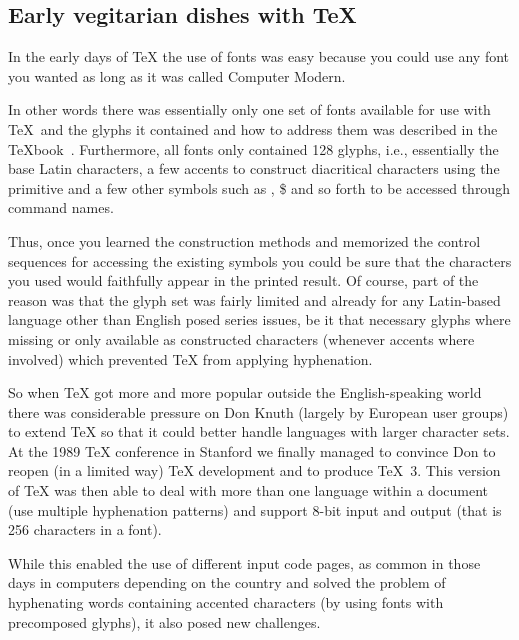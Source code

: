\documentclass{ltugboat}
\begin{document}
\subsection{Early  vegitarian dishes with \TeX{}}

In the early days of \TeX{} the use of fonts was easy because you
could use any font you wanted as long as it was called Computer
Modern.

In other words there was essentially only one set of fonts available
for use with \TeX\ and the glyphs it contained and how to address them
was described in the \TeX{}book~\cite{}. Furthermore, all fonts only
contained 128 glyphs, i.e., essentially the base Latin characters, a
few accents to construct diacritical characters using the 
primitive and a few other symbols such as \textdagger, \$ and so forth
to be accessed through command names.

Thus, once you learned the construction methods and memorized the
control sequences for accessing the existing symbols you could be sure
that the characters you used would faithfully appear in the printed
result. Of course, part of the reason was that the glyph set was
fairly limited and already for any Latin-based language other than
English posed series issues, be it that necessary glyphs where missing
or only available as constructed characters (whenever accents where
involved) which prevented \TeX{} from applying hyphenation.

So when \TeX{} got more and more popular outside the English-speaking
world there was considerable pressure on Don Knuth (largely by
European user groups) to extend \TeX{} so that it could better handle
languages with larger character sets. At the 1989 \TeX{} conference in
Stanford we finally managed to convince Don to reopen (in a limited
way) \TeX{} development and to produce \TeX~3. This version of \TeX{}
was then able to deal with more than one language within a document
(use multiple hyphenation patterns) and support 8-bit input and output
(that is 256 characters in a font).

While this enabled the use of different input code pages, as common in
those days in computers depending on the country and solved the
problem of hyphenating words containing accented characters (by using
fonts with precomposed glyphs), it also posed new challenges.
\end{document}

